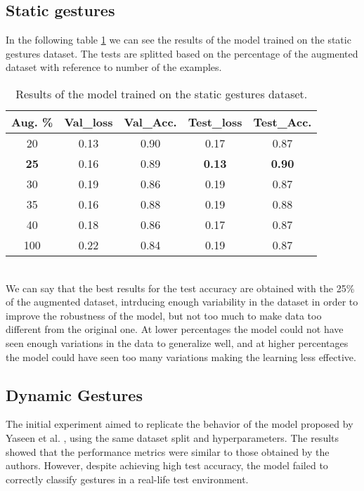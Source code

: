 \documentclass[10pt,twocolumn,letterpaper]{article}
\begin{document}
\subsection{Static gestures}
In the following table \ref{tab:staticGestures} we can see the results of the model 
trained on the static gestures dataset. 
The tests are splitted based on the percentage of the augmented dataset with reference to number of the examples.
\begin{table}[h]
   \begin{center}
   \begin{tabular}{|c|c|c|c|c|}
   \hline
   \textbf{Aug. \%} & \textbf{Val\_loss} & \textbf{Val\_Acc.} & \textbf{Test\_loss} & \textbf{Test\_Acc.}\\
   \hline\hline
   20 & 0.13 & 0.90 & 0.17 & 0.87 \\
   \textbf{25} & 0.16 & 0.89 & \textbf{0.13} & \textbf{0.90} \\
   30 & 0.19 & 0.86 & 0.19 & 0.87 \\
   35 & 0.16 & 0.88 & 0.19 & 0.88 \\
   40 & 0.18 & 0.86 & 0.17 & 0.87 \\
   100 & 0.22 & 0.84 & 0.19 & 0.87 \\ 
   \hline
   \end{tabular}
   \end{center}
   \caption{Results of the model trained on the static gestures dataset.}
   \label{tab:staticGestures}
\end{table} \\
We can say that the best results for the test accuracy are obtained with the 25\% of the 
augmented dataset, intrducing enough variability in the dataset in order to 
improve the robustness of the model, but not too much to make data too different from the original one.
At lower percentages the model could not have seen enough variations in the data to generalize well, and at 
higher percentages the model could have seen too many variations making the learning less effective.
\subsection{Dynamic Gestures}
The initial experiment aimed to replicate the behavior of the model proposed by Yaseen et al. \cite{electronics13163233}, using the same dataset split and hyperparameters.  
The results showed that the performance metrics were similar to those obtained by the authors. However, despite achieving high test accuracy, the model failed to correctly classify gestures in a real-life test environment.  
\end{document}
